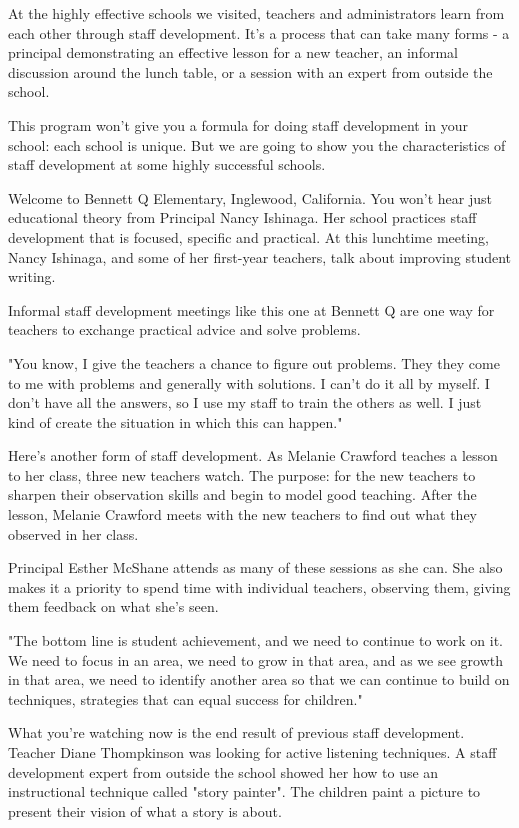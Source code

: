 At the highly effective schools we visited, teachers and administrators learn from each other through staff development. It's a process that can take many forms - a principal demonstrating an effective lesson for a new teacher, an informal discussion around the lunch table, or a session with an expert from outside the school.

This program won't give you a formula for doing staff development in your school: each school is unique. But we are going to show you the characteristics of staff development at some highly successful schools.

Welcome to Bennett Q Elementary, Inglewood, California. You won't hear just educational theory from Principal Nancy Ishinaga. Her school practices staff development that is focused, specific and practical. At this lunchtime meeting, Nancy Ishinaga, and some of her first-year teachers, talk about improving student writing.

Informal staff development meetings like this one at Bennett Q are one way for teachers to exchange practical advice and solve problems.

"You know, I give the teachers a chance to figure out problems. They they come to me with problems and generally with solutions. I can't do it all by myself. I don't have all the answers, so I use my staff to train the others as well. I just kind of create the situation in which this can happen."

Here's another form of staff development. As Melanie Crawford teaches a lesson to her class, three new teachers watch. The purpose: for the new teachers to sharpen their observation skills and begin to model good teaching. After the lesson, Melanie Crawford meets with the new teachers to find out what they observed in her class.

Principal Esther McShane attends as many of these sessions as she can. She also makes it a priority to spend time with individual teachers, observing them, giving them feedback on what she's seen.

"The bottom line is student achievement, and we need to continue to work on it. We need to focus in an area, we need to grow in that area, and as we see growth in that area, we need to identify another area so that we can continue to build on techniques, strategies that can equal success for children."

What you're watching now is the end result of previous staff development. Teacher Diane Thompkinson was looking for active listening techniques. A staff development expert from outside the school showed her how to use an instructional technique called "story painter". The children paint a picture to present their vision of what a story is about.


